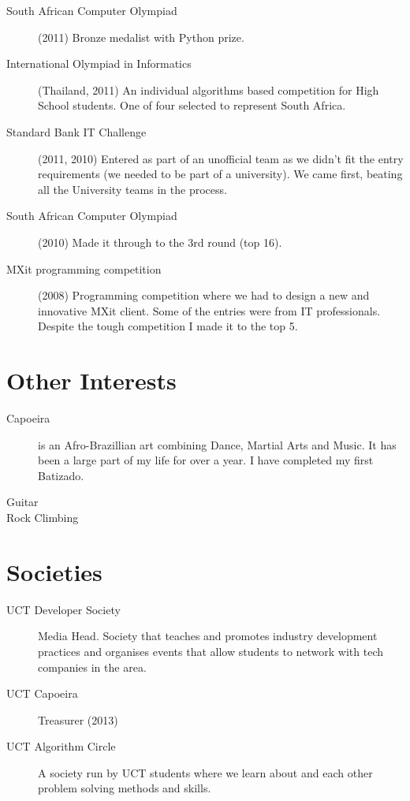 \documentclass[margin,line,a4paper]{resume}
\begin{document}
\begin{resume}
\begin{description}
                \item [South African Computer Olympiad] (2011) Bronze medalist with Python prize.

                \item [International Olympiad in Informatics] (Thailand, 2011) An individual 
                algorithms based competition for High School students. One of four selected
                to represent South Africa.

                \item [Standard Bank IT Challenge] (2011, 2010) Entered as part of an unofficial team
                as we didn't fit the entry requirements (we needed to be part of a university).
                We came first, beating all the University teams in the process.

                \item [South African Computer Olympiad] (2010) Made it through to the 3rd
                round (top 16).

                \item [MXit programming competition] (2008) Programming competition where we
                had to design a new and innovative MXit client.  Some of the
                entries were from IT professionals. Despite the tough competition I made it to the top 5.
            \end{description}

        \section{\mysidestyle Other Interests}
            \begin{description}
                \item[Capoeira] is an Afro-Brazillian art combining Dance, Martial Arts and Music. It has
                    been a large part of my life for over a year. I have completed my first Batizado.
                \item[Guitar]
                \item[Rock Climbing]
            \end{description}

        \section{\mysidestyle Societies}
            \begin{description}
                \item [UCT Developer Society] Media Head. Society that teaches and promotes industry development practices
                  and organises events that allow students to network with tech companies in the area.
                \item [UCT Capoeira] Treasurer (2013)
                \item [UCT Algorithm Circle] A society run by UCT students where we learn about and
                each other problem solving methods and skills.


\end{description}
\end{resume}
\end{document}
